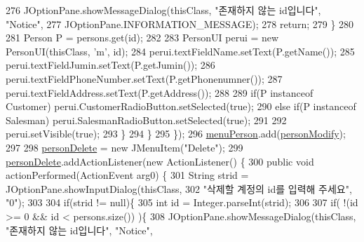 \begin{DoxyCode}
276                         JOptionPane.showMessageDialog(thisClass, \textcolor{stringliteral}{"존재하지 않는 id입니다"}, \textcolor{stringliteral}{"Notice"}, 
277                                 JOptionPane.INFORMATION\_MESSAGE);
278                         \textcolor{keywordflow}{return};
279                     \}
280                     
281                     Person P = persons.get(\textcolor{keywordtype}{id});
282                     
283                     PersonUI perui = \textcolor{keyword}{new} PersonUI(thisClass, \textcolor{charliteral}{'m'}, \textcolor{keywordtype}{id});
284                     perui.textFieldName.setText(P.getName());
285                     perui.textFieldJumin.setText(P.getJumin());
286                     perui.textFieldPhoneNumber.setText(P.getPhonenumner());
287                     perui.textFieldAddress.setText(P.getAddress());
288                     
289                     \textcolor{keywordflow}{if}(P instanceof Customer) perui.CustomerRadioButton.setSelected(\textcolor{keyword}{true});
290                     \textcolor{keywordflow}{else} \textcolor{keywordflow}{if}(P instanceof Salesman) perui.SalesmanRadioButton.setSelected(\textcolor{keyword}{true});
291                     
292                     perui.setVisible(\textcolor{keyword}{true}); 
293                 \}
294             \}
295         \});
296         \hyperlink{classpkg_1_1_management_u_i_aac445016414136b78a968311480e8308}{menuPerson}.add(\hyperlink{classpkg_1_1_management_u_i_aadf201377400033cf5739556137eca44}{personModify});
297         
298         \hyperlink{classpkg_1_1_management_u_i_af5e74a22293246fcc049a6e21024e96f}{personDelete} = \textcolor{keyword}{new} JMenuItem(\textcolor{stringliteral}{"Delete"});
299         \hyperlink{classpkg_1_1_management_u_i_af5e74a22293246fcc049a6e21024e96f}{personDelete}.addActionListener(\textcolor{keyword}{new} ActionListener() \{
300             \textcolor{keyword}{public} \textcolor{keywordtype}{void} actionPerformed(ActionEvent arg0) \{
301                 String strid = JOptionPane.showInputDialog(thisClass,
302                         \textcolor{stringliteral}{"삭제할 계정의 id를 입력해 주세요"}, \textcolor{stringliteral}{"0"});
303                 
304                 \textcolor{keywordflow}{if}(strid != null)\{
305                     \textcolor{keywordtype}{int} \textcolor{keywordtype}{id} = Integer.parseInt(strid);
306                     
307                     \textcolor{keywordflow}{if}( !(\textcolor{keywordtype}{id} >= 0 && \textcolor{keywordtype}{id} < persons.size()) )\{
308                         JOptionPane.showMessageDialog(thisClass, \textcolor{stringliteral}{"존재하지 않는 id입니다"}, \textcolor{stringliteral}{"Notice"}, 

\end{DoxyCode}

